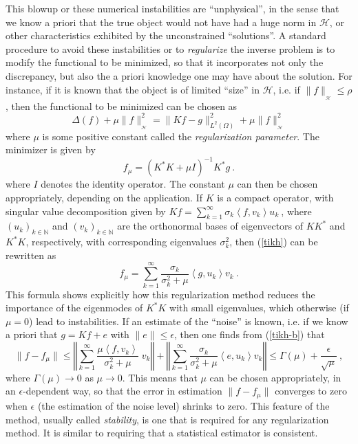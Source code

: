\documentclass[10pt]{article}
\def\N{\mathbb{N}}
\def\cH{\mathcal{H}}
\def\K{K^*}
\newcommand\eref[1]{(\ref{#1})}
\begin{document}
This blowup or these numerical instabilities are ``unphysical'', in the sense
that we know a priori that the true object would not have had a huge norm in
$\cH$, or other characteristics exhibited by the unconstrained ``solutions''.
A standard procedure to avoid these instabilities or to {\em regularize}
the inverse
problem is to modify the functional to be minimized, so that it
incorporates not
only  the discrepancy, but also the a priori knowledge one may have about the
solution.  For instance, if it is known that the object is of limited ``size''
in $\cH$, i.e. if
$\|f\|_{_{\cH}} \leq \rho$ , then the functional to be minimized can be chosen
as
\begin{equation*}
\Delta(f) + \mu \|f\|_{_{\cH}}^2 = \|Kf-g\|_{L^2(\Omega)}^2 +\mu
\|f\|_{_{\cH}}^2
\end{equation*}
where $\mu$ is some positive constant called the {\it regularization
parameter}. The minimizer is given by
\begin{equation}
\label{tikh}
f_\mu=(\K K + \mu I)^{-1} K^* g ~.
\end{equation}
where $I$ denotes the identity operator.
The constant $\mu$ can then be chosen appropriately,
depending on the application.
If $K$ is a
compact operator, with singular value decomposition given by
$Kf =\sum_{k=1}^{\infty} \sigma_k \left<f,v_k\right> u_k ~$, where $(u_k)_{k
\in \N}$ and $(v_k)_{k \in \N}$ are the orthonormal bases of eigenvectors of
$KK^*$ and $\K K$, respectively, with corresponding eigenvalues $\sigma_k^2$,
then \eref{tikh} can be rewritten as
\begin{equation}
\label{tikh-b}
f_\mu= \sum_{k=1}^{\infty} \frac{\sigma_k}{\sigma_k^2 + \mu}
\left<g, u_k\right> v_k ~.
\end{equation}
This formula shows explicitly how this regularization method reduces the
importance
of the eigenmodes of $\K K$ with small eigenvalues, which otherwise (if
$\mu =0$)
lead to instabilities. If an estimate of the ``noise'' is known, i.e. if
we know a priori that $g=Kf+e$ with $\|e\| \leq \epsilon$, then one finds
from \eref{tikh-b} that
\begin{equation*}
\| f - f_\mu \| \leq \left\Vert \sum_{k=1}^{\infty}
\frac{ \mu \left< f,v_k\right> }{\sigma_k^2+\mu}\; v_k \right\Vert +
\left\Vert \sum_{k=1}^{\infty} \frac{\sigma_k}{\sigma_k^2+\mu}
\left< e,u_k\right> v_k \right\Vert
\leq \Gamma(\mu) + \frac{\epsilon}{\sqrt\mu} ~,
\end{equation*}
where $\Gamma(\mu) \rightarrow 0$ as $\mu \rightarrow 0$. This means that
$\mu$ can be chosen appropriately, in an $\epsilon$-dependent way,
so that the error in estimation
$\|f - f_\mu \|$ converges to zero when $\epsilon$ (the estimation of
the noise level) shrinks to zero. This feature of the method, usually called
{\em stability}, is one that is required for any regularization method.
It is similar to requiring that a statistical estimator is consistent.
\end{document}
